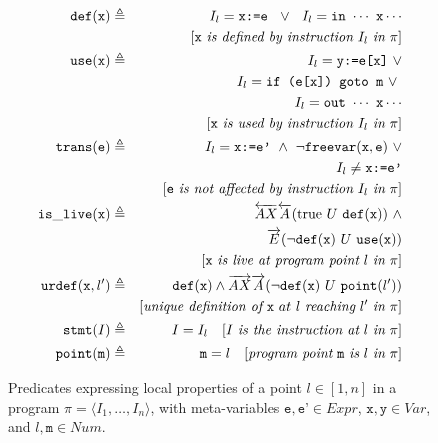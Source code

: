\begin{figure}[hb]
\vspace{-3mm}
\begin{small}
\begin{eqnarray*}
\text{${\tt def}$}(\text{${\tt x}$}) & \triangleq & I_l= \texttt{x:=e} ~~ \vee ~~ I_l= \texttt{in} ~ \cdots ~ \texttt{x} \cdots \\
                            &            & [\text{${\tt x}$} ~ \textit{is defined by instruction} ~ I_l ~ \textit{in} ~ \pi] \\
\text{${\tt use}$}(\text{${\tt x}$}) & \triangleq & I_l= \texttt{y:=e[x]} ~ \vee  \\
                            &            & I_l= \texttt{if (e[x]) goto m} ~ \vee \ \\
                            &            & I_l= \texttt{out} ~ \cdots ~ \texttt{x} \cdots \\
                            &            & [\text{${\tt x}$} ~ \textit{is used by instruction} ~ I_l ~ \textit{in} ~ \pi] \\
\text{${\tt trans}$}(\text{${\tt e}$}) & \triangleq & I_l= \texttt{x:=e'} ~ \wedge ~ \neg\text{${\tt freevar}$}(\text{${\tt x}$},\text{${\tt e}$}) ~ \vee \\
                            &            & I_l\neq\texttt{x:=e'} \\
                            &            & [\text{${\tt e}$} ~ \textit{is not affected by instruction} ~ I_l ~ \textit{in} ~ \pi] \\
\text{${\tt is\_live}$}(\text{${\tt x}$}) & \triangleq & \overleftarrow{AX}\overleftarrow{A}(\text{true} ~ U ~ \text{${\tt def}$}(\text{${\tt x}$})) ~ \wedge \\
                            &            & \overrightarrow{E}(\neg\text{${\tt def}$}(\text{${\tt x}$}) ~ U ~ \text{${\tt use}$}(\text{${\tt x}$})) \\
                            &            & [\text{${\tt x}$} ~ \textit{is live at program point} ~ l ~ \textit{in} ~ \pi] \\
\text{${\tt urdef}$}(\text{${\tt x}$},l') & \triangleq & \text{${\tt def}$}(\text{${\tt x}$})\wedge\overrightarrow{AX}\overrightarrow{A}(\neg\text{${\tt def}$}(\text{${\tt x}$}) ~ U ~ \text{${\tt point}$}(l')) \\
                            &            & [\textit{unique definition of}~\text{${\tt x}$}~{at}~l~\textit{reaching}~l'~\textit{in} ~ \pi] \\
\text{${\tt stmt}$}(I) & \triangleq & I=I_l ~~~ [I ~ \textit{is the instruction at} ~ l ~ \textit{in} ~ \pi]\\
\text{${\tt point}$}(\texttt{m}) & \triangleq & \texttt{m}=l ~~~ [\textit{program point} ~ \text{${\tt m}$} ~ \textit{is} ~ l ~ \textit{in} ~ \pi]
\end{eqnarray*}
\vspace{-4mm}
\end{small}
\caption{\label{fig:osr-loc-pred}Predicates expressing local properties of a point $l\in [1,n]$ in a program $\pi=\langle I_1,\ldots,I_n\rangle$, with meta-variables $\texttt{e},\texttt{e'}\in Expr$, $\texttt{x}, \texttt{y}\in Var$, and $l, \texttt{m}\in Num$.}
\end{figure}

